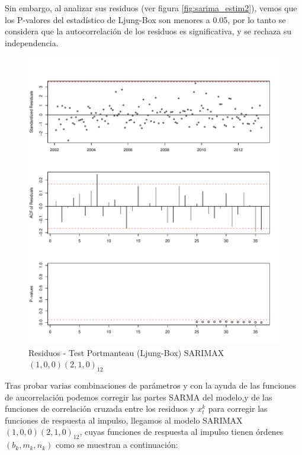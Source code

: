\documentclass[12pt,oneside]{book}\usepackage[]{graphicx}\usepackage[]{color}
\makeatletter
\def\maxwidth{ %
  \ifdim\Gin@nat@width>\linewidth
    \linewidth
  \else
    \Gin@nat@width
  \fi
}
\newenvironment{knitrout}{}{} %
\theoremstyle{definition} %
\makeatother
\begin{document}
Sin embargo, al analizar sus residuos (ver figura \ref{fig:sarima_estim2}), vemos que los P-valores del estadístico de Ljung-Box son menores a 0.05, por lo tanto se considera que la autocorrelación de los residuos es significativa, y se rechaza su independencia.

\begin{knitrout}
\color{fgcolor}\begin{figure}[h]

{\centering \includegraphics[width=\maxwidth]{figure/unnamed-chunk-53-1} 

}

\caption{\label{fig:sarima_estim2} Residuos - Test Portmanteau (Ljung-Box) SARIMAX $(1,0,0)(2,1,0)_{12}$}\label{fig:unnamed-chunk-53}
\end{figure}


\end{knitrout}






Tras probar varias combinaciones de parámetros y con la ayuda de las funciones de aucorrelación podemos corregir las partes SARMA del modelo,y de las funciones de correlación cruzada entre los residuos y $x_t^{k}$ para corregir las funciones de respuesta al impulso, llegamos al modelo SARIMAX $(1,0,0)(2,1,0)_{12}$, cuyas funciones de respuesta al impulso tienen órdenes $(b_k,m_k,n_k)$ como se muestran a continuación:
\end{document}
